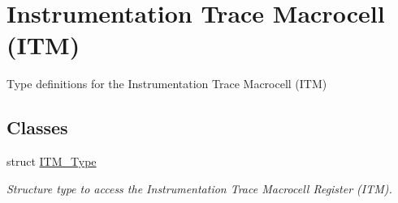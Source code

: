\hypertarget{group___c_m_s_i_s___i_t_m}{}\section{Instrumentation Trace Macrocell (I\+TM)}
\label{group___c_m_s_i_s___i_t_m}


Type definitions for the Instrumentation Trace Macrocell (I\+TM)  


\subsection*{Classes}
\begin{DoxyCompactItemize}
\item 
struct \mbox{\hyperlink{struct_i_t_m___type}{I\+T\+M\+\_\+\+Type}}
\begin{DoxyCompactList}\small\item\em Structure type to access the Instrumentation Trace Macrocell Register (I\+TM). \end{DoxyCompactList}\end{DoxyCompactItemize}
